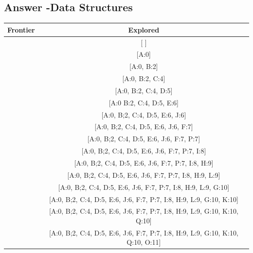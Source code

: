 \documentclass{article}
\begin{document}
\subsection{Answer -Data Structures}
\begin{center}
    \begin{tabular}{ l | c}
    
    \hline
    \textbf{Frontier} & \textbf{Explored}\\
    
    \hline
    [A:0] &  [ ] \\ \hline 
    [B:2, C:4, D:6] & [A:0] \\ \hline
    [C:4, D:6, E:9] & [A:0, B:2] \\ \hline
    [D:5, E:6] & [A:0, B:2, C:4] \\ \hline
    [E:6, J:6, F:8, H:9, L:10] & [A:0, B:2, C:4, D:5] \\ \hline
    [J:6, F:7, P:7, H:9, I:9, L:10, G:11] & [A:0 B:2, C:4, D:5, E:6] \\ \hline
    [F:7, P:7, H:9, I:9, L:10, G:11] & [A:0, B;2, C:4, D:5, E:6, J:6] \\ \hline
    [P:7, H:9, I:9, L:9, G:10, M:12] & [A:0, B;2, C:4, D:5, E:6, J:6, F:7] \\ \hline
    [I:8, H:9, L:9, G:10, M:12] & [A:0, B;2, C:4, D:5, E:6, J:6, F:7, P:7] \\ \hline
    [H:9, L:9, G:10, Q:10, O:11, M:12] & [A:0, B;2, C:4, D:5, E:6, J:6, F:7, P:7, I:8] \\ \hline
    [L:9, G:10, K:10, Q:10, O:11, M:12] & [A:0, B;2, C:4, D:5, E:6, J:6, F:7, P:7, I:8, H:9] \\ \hline
    [G:10, K:10, Q:10, O:11, M:12] & [A:0, B;2, C:4, D:5, E:6, J:6, F:7, P:7, I:8, H:9, L:9] \\ \hline
    [K:10, Q:10, O:11, M:12] & [A:0, B;2, C:4, D:5, E:6, J:6, F:7, P:7, I:8, H:9, L:9, G:10] \\ \hline
    [Q:10, O:11, M:12] & [A:0, B;2, C:4, D:5, E:6, J:6, F:7, P:7, I:8, H:9, L:9, G:10, K:10] \\ \hline
    [O:11, M:12] & [A:0, B;2, C:4, D:5, E:6, J:6, F:7, P:7, I:8, H:9, L:9, G:10, K:10, Q:10] \\ \hline
    [M:12] & [A:0, B;2, C:4, D:5, E:6, J:6, F:7, P:7, I:8, H:9, L:9, G:10, K:10, Q:10, O:11] \\ \hline
        
    \end{tabular}
\end{center}  
\end{document}
